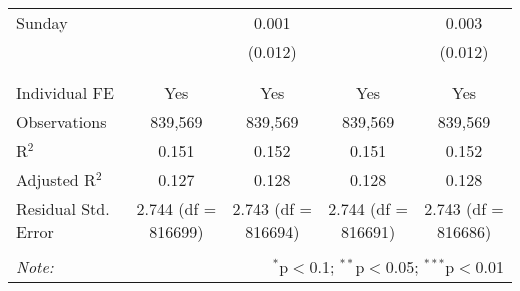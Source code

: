 \documentclass[
]{article}
\begin{document}
\begin{table}[!htbp]
{\begin{tabular}{@{\extracolsep{5pt}}lcccc}
 Sunday &  & 0.001 &  & 0.003 \\ 
  &  & (0.012) &  & (0.012) \\ 
  & & & & \\ 
\hline \\[-1.8ex] 
Individual FE & Yes & Yes & Yes & Yes \\ 
Observations & 839,569 & 839,569 & 839,569 & 839,569 \\ 
R$^{2}$ & 0.151 & 0.152 & 0.151 & 0.152 \\ 
Adjusted R$^{2}$ & 0.127 & 0.128 & 0.128 & 0.128 \\ 
Residual Std. Error & 2.744 (df = 816699) & 2.743 (df = 816694) & 2.744 (df = 816691) & 2.743 (df = 816686) \\ 
\hline 
\hline \\[-1.8ex] 
\textit{Note:}  & \multicolumn{4}{r}{$^{*}$p$<$0.1; $^{**}$p$<$0.05; $^{***}$p$<$0.01} \\ 
\end{tabular}
} 
\end{table}
\end{document}
